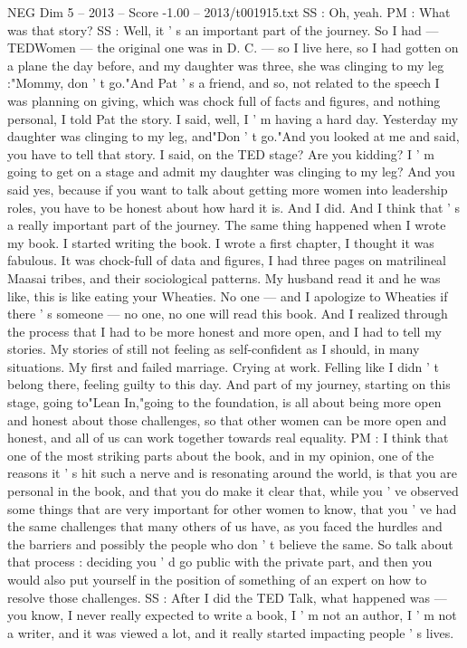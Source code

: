\begin{textsample}{NEG Dim 5 – 2013 – Score -1.00 – 2013/t001915.txt}
SS : Oh, yeah.
PM : What was that story?
SS : Well, it ' s an important part of the journey.
So I had — TEDWomen — the original one was in D.
C. — so I live here, so I had gotten on a plane the day before, and my daughter was three, she was clinging to my leg :"Mommy, don ' t go."And Pat ' s a friend, and so, not related to the speech I was planning on giving, which was chock full of facts and figures, and nothing personal, I told Pat the story.
I said, well, I ' m having a hard day.
Yesterday my daughter was clinging to my leg, and"Don ' t go."And you looked at me and said, you have to tell that story.
I said, on the TED stage?
Are you kidding?
I ' m going to get on a stage and admit my daughter was clinging to my leg?
And you said yes, because if you want to talk about getting more women into leadership roles, you have to be honest about how hard it is.
And I did.
And I think that ' s a really important part of the journey.
The same thing happened when I wrote my book.
I started writing the book.
I wrote a first chapter, I thought it was fabulous.
It was chock-full of data and figures, I had three pages on matrilineal Maasai tribes, and their sociological patterns.
My husband read it and he was like, this is like eating your Wheaties.
No one — and I apologize to Wheaties if there ' s someone — no one, no one will read this book.
And I realized through the process that I had to be more honest and more open, and I had to tell my stories.
My stories of still not feeling as self-confident as I should, in many situations.
My first and failed marriage.
Crying at work.
Felling like I didn ' t belong there, feeling guilty to this day.
And part of my journey, starting on this stage, going to"Lean In,"going to the foundation, is all about being more open and honest about those challenges, so that other women can be more open and honest, and all of us can work together towards real equality.
PM : I think that one of the most striking parts about the book, and in my opinion, one of the reasons it ' s hit such a nerve and is resonating around the world, is that you are personal in the book, and that you do make it clear that, while you ' ve observed some things that are very important for other women to know, that you ' ve had the same challenges that many others of us have, as you faced the hurdles and the barriers and possibly the people who don ' t believe the same.
So talk about that process : deciding you ' d go public with the private part, and then you would also put yourself in the position of something of an expert on how to resolve those challenges.
SS : After I did the TED Talk, what happened was — you know, I never really expected to write a book, I ' m not an author, I ' m not a writer, and it was viewed a lot, and it really started impacting people ' s lives.

\end{textsample}
